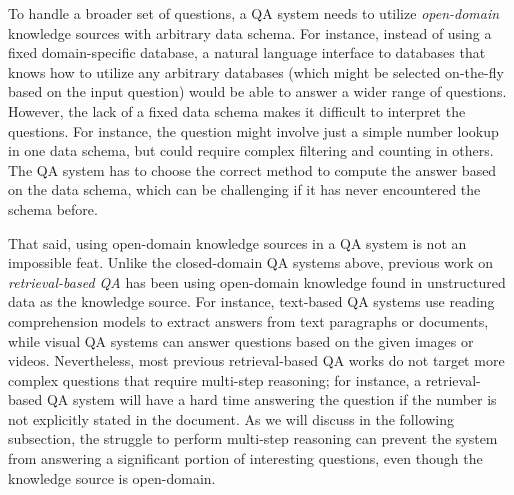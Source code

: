 To handle a broader set of questions,
a QA system needs to utilize
\emph{open-domain} knowledge sources with arbitrary data schema.
For instance,
instead of using a fixed domain-specific database,
a natural language interface to databases
that knows how to utilize any arbitrary databases
(which might be selected on-the-fly based on the input question)
would be able to answer a wider range of questions.
However,
the lack of a fixed data schema
makes it difficult to interpret the questions.
For instance, the question
might involve just a simple number lookup in one data schema,
but could require complex filtering and counting
in others.
The QA system has to choose the correct method to compute the answer
based on the data schema, which can be challenging
if it has never encountered the schema before.

That said,
using open-domain knowledge sources in a QA system
is not an impossible feat.
Unlike the closed-domain QA systems above,
previous work on \emph{retrieval-based QA} has been using
open-domain knowledge found in unstructured data as the knowledge source.
For instance,
text-based QA systems
\cite{voorhees1999overview,brill2002askmsr,seo2016bidaf,chen2017reading}
use reading comprehension models to extract answers
from text paragraphs or documents,
while visual QA systems
\cite{antol2015vqa,tapaswi2016movieqa}
can answer questions based on the given images or videos.
Nevertheless,
most previous retrieval-based QA works
do not target more complex questions that require multi-step reasoning;
for instance, a retrieval-based QA system will have a hard time
answering the question 
if the number is not explicitly stated in the document.
As we will discuss in the following subsection,
the struggle to perform multi-step reasoning
can prevent the system from answering
a significant portion of interesting questions,
even though the knowledge source is open-domain.

